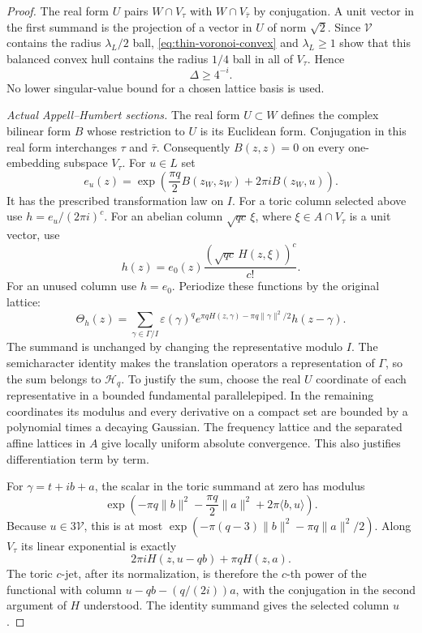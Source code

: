 \begin{proof}
The real form $U$ pairs $W\cap V_\tau$ with
$W\cap V_{\bar\tau}$ by conjugation.  A unit vector in the
first summand is the projection of a vector in $U$ of norm
$\sqrt2$.  Since $\mathcal V$ contains the radius
$\lambda_L/2$ ball, \eqref{eq:thin-voronoi-convex} and
$\lambda_L\ge1$ show that this balanced convex hull contains
the radius $1/4$ ball in all of $V_\tau$.  Hence
\begin{equation}\label{eq:thin-leading-determinant}
                              \Delta\ge4^{-i}.
\end{equation}
No lower singular-value bound for a chosen lattice basis is used.

\emph{Actual Appell--Humbert sections.}
The real form $U\subset W$ defines the complex bilinear form
$B$ whose restriction to $U$ is its Euclidean form.  Conjugation
in this real form interchanges $\tau$ and $\bar\tau$.
Consequently $B(z,z)=0$ on every one-embedding subspace
$V_\tau$.  For $u\in L$ set
\[
 e_u(z)=\exp\left(\frac{\pi q}2B(z_W,z_W)
                                  +2\pi iB(z_W,u)\right).
\]
It has the prescribed transformation law on $I$.
For a toric column selected above use
$h=e_u/(2\pi i)^c$.  For an abelian column
$\sqrt{qc}\,\xi$, where $\xi\in A\cap V_\tau$ is a unit
vector, use
\[
                       h(z)=e_0(z)
                     \frac{(\sqrt{qc}\,H(z,\xi))^c}{c!}.
\]
For an unused column use $h=e_0$.
Periodize these functions by the original lattice:
\begin{equation}\label{eq:thin-periodization}
 \Theta_h(z)=\sum_{\gamma\in\Gamma/I}
   \varepsilon(\gamma)^q
   e^{\pi qH(z,\gamma)-\pi q\|\gamma\|^2/2}h(z-\gamma).
\end{equation}
The summand is unchanged by changing the representative modulo
$I$.  The semicharacter identity makes the translation operators
a representation of $\Gamma$, so the sum belongs to
$\mathcal H_q$.  To justify the sum, choose the real $U$
coordinate of each representative in a bounded fundamental
parallelepiped.  In the remaining coordinates its modulus and
every derivative on a compact set are bounded by a polynomial
times a decaying Gaussian.  The frequency lattice and the
separated affine lattices in $A$ give locally uniform absolute
convergence.  This also justifies differentiation term by term.

For $\gamma=t+ib+a$, the scalar in the toric summand at zero
has modulus
\begin{equation}\label{eq:thin-summand-modulus}
  \exp\left(-\pi q\|b\|^2-\frac{\pi q}2\|a\|^2
                                          +2\pi\langle b,u\rangle\right).
\end{equation}
Because $u\in3\mathcal V$, this is at most
$\exp(-\pi(q-3)\|b\|^2-\pi q\|a\|^2/2)$.
Along $V_\tau$ its linear exponential is exactly
\[
            2\pi iH(z,u-qb)+\pi qH(z,a).
\]
The toric $c$-jet, after its normalization, is therefore the
$c$-th power of the functional with column
$u-qb-(q/(2i))a$, with the conjugation in the second argument
of $H$ understood.  The identity summand gives the selected column
$u$.


\end{proof}
